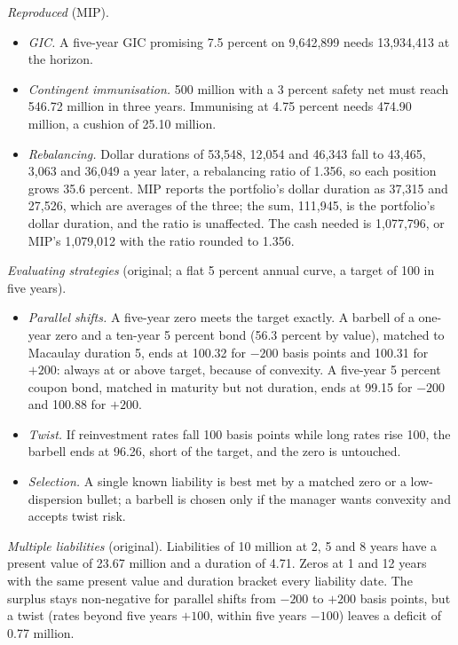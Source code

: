 \begin{qfmethod}
 \emph{Reproduced} (MIP).
\begin{itemize}
\item \emph{GIC.} A five-year GIC promising 7.5 percent on 9{,}642{,}899 needs 13{,}934{,}413 at the horizon.
\item \emph{Contingent immunisation.} 500 million with a 3 percent safety net must reach 546.72 million in three years. Immunising at 4.75 percent needs 474.90 million, a cushion of 25.10 million.
\item \emph{Rebalancing.} Dollar durations of 53{,}548, 12{,}054 and 46{,}343 fall to 43{,}465, 3{,}063 and 36{,}049 a year later, a rebalancing ratio of 1.356, so each position grows 35.6 percent. MIP reports the portfolio's dollar duration as 37{,}315 and 27{,}526, which are averages of the three; the sum, 111{,}945, is the portfolio's dollar duration, and the ratio is unaffected. The cash needed is 1{,}077{,}796, or MIP's 1{,}079{,}012 with the ratio rounded to 1.356.
\end{itemize}

\emph{Evaluating strategies} (original; a flat 5 percent annual curve, a target of 100 in five years).
\begin{itemize}
\item \emph{Parallel shifts.} A five-year zero meets the target exactly. A barbell of a one-year zero and a ten-year 5 percent bond (56.3 percent by value), matched to Macaulay duration 5, ends at 100.32 for $-200$ basis points and 100.31 for $+200$: always at or above target, because of convexity. A five-year 5 percent coupon bond, matched in maturity but not duration, ends at 99.15 for $-200$ and 100.88 for $+200$.
\item \emph{Twist.} If reinvestment rates fall 100 basis points while long rates rise 100, the barbell ends at 96.26, short of the target, and the zero is untouched.
\item \emph{Selection.} A single known liability is best met by a matched zero or a low-dispersion bullet; a barbell is chosen only if the manager wants convexity and accepts twist risk.
\end{itemize}

\emph{Multiple liabilities} (original). Liabilities of 10 million at 2, 5 and 8 years have a present value of 23.67 million and a duration of 4.71. Zeros at 1 and 12 years with the same present value and duration bracket every liability date. The surplus stays non-negative for parallel shifts from $-200$ to $+200$ basis points, but a twist (rates beyond five years $+100$, within five years $-100$) leaves a deficit of 0.77 million.


\end{qfmethod}
